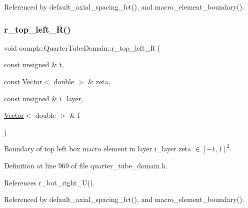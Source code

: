 Referenced by default\+\_\+axial\+\_\+spacing\+\_\+fct(), and macro\+\_\+element\+\_\+boundary().

\mbox{\label{classoomph_1_1QuarterTubeDomain_a1aded600b61798fbc080189fadd1c603}} 
\subsubsection{\texorpdfstring{r\+\_\+top\+\_\+left\+\_\+\+R()}{r\_top\_left\_R()}}
{\footnotesize\ttfamily void oomph\+::\+Quarter\+Tube\+Domain\+::r\+\_\+top\+\_\+left\+\_\+R (\begin{DoxyParamCaption}\item[{const unsigned \&}]{t,  }\item[{const \hyperlink{classoomph_1_1Vector}{Vector}$<$ double $>$ \&}]{zeta,  }\item[{const unsigned \&}]{i\+\_\+layer,  }\item[{\hyperlink{classoomph_1_1Vector}{Vector}$<$ double $>$ \&}]{f }\end{DoxyParamCaption})\hspace{0.3cm}{\ttfamily [private]}}



Boundary of top left box macro element in layer i\+\_\+layer zeta $ \in [-1,1]^2 $. 



Definition at line 969 of file quarter\+\_\+tube\+\_\+domain.\+h.



References r\+\_\+bot\+\_\+right\+\_\+\+U().



Referenced by default\+\_\+axial\+\_\+spacing\+\_\+fct(), and macro\+\_\+element\+\_\+boundary().

\mbox{\label{classoomph_1_1QuarterTubeDomain_ac1cda2361ed175bdf52032dce05f4365}} 
